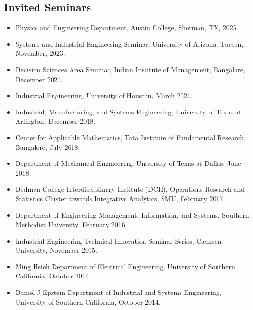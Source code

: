 \documentclass[hyperref, margin]{myResume}
\begin{document}
\begin{resume}
\section{Invited Seminars}
	\begin{itemize}[leftmargin=*]
		\item Physics and Engineering Department, Austin College, Sherman, TX, 2025.
		\item Systems and Industrial Engineering Seminar, University of Arizona, Tucson, November, 2023.
		\item Decision Sciences Area Seminar, Indian Institute of Management, Bangalore, December 2021.
		\item Industrial Engineering, University of Houston, March 2021.
		\item Industrial, Manufacturing, and Systems Engineering, University of Texas at Arlington, December 2018.
		\item Center for Applicable Mathematics, Tata Institute of Fundamental Research, Bangalore, July 2018.
		\item Department of Mechanical Engineering, University of Texas at Dallas, June 2018.
		\item Dedman College Interdisciplinary Institute (DCII), Operations Research and Statistics Cluster towards Integrative Analytics, SMU, February 2017.
		\item Department of Engineering Management, Information, and Systems, Southern Methodist University, February 2016.
		\item Industrial Engineering Technical Innovation Seminar Series, Clemson University, November 2015.
		\item Ming Hsieh Department of Electrical Engineering, University of Southern California, October 2014.
		\item Daniel J Epstein Department of Industrial and Systems Engineering, University of Southern California, October 2014.
	\end{itemize}


\end{resume}
\end{document}

